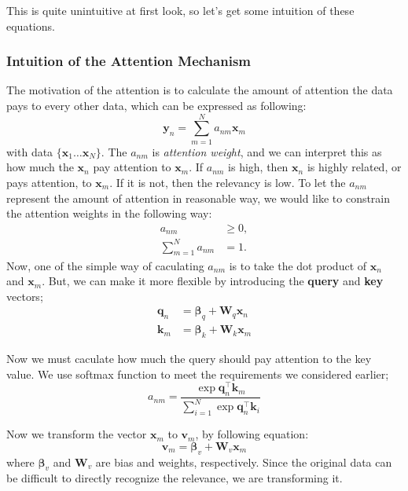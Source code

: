 \documentclass{article}
\begin{document}
            This is quite unintuitive at first look, so let's get some intuition of these equations.

        \subsubsection{Intuition of the Attention Mechanism}
            The motivation of the attention is to calculate the amount of attention the data pays to every other data,
            which can be expressed as following:
            \[
            \textbf{y}_n = \sum_{m=1}^{N}a_{nm}\textbf{x}_m
            \]
            with data $\{\textbf{x}_1 \dots \textbf{x}_N\}$.
            The $a_{nm}$ is \emph{attention weight}, and we can interpret this as how much the $\textbf{x}_n$ pay attention to $\textbf{x}_m$.
            If $a_{nm}$ is high, then $\textbf{x}_n$ is highly related, or pays attention, to $\textbf{x}_m$.
            If it is not, then the relevancy is low.
            To let the $a_{nm}$ represent the amount of attention in reasonable way, 
            we would like to constrain the attention weights
            in the following way:
            \begin{align*}
                a_{nm} & \geq 0, \\
                \sum_{m=1}^{N}a_{nm} & = 1.
            \end{align*}
            Now, one of the simple way of caculating $a_{nm}$ is to take the dot product of $\textbf{x}_n$ and $\textbf{x}_m$.
            But, we can make it more flexible by introducing the \textbf{query} and \textbf{key} vectors;
            \begin{align*}
                \textbf{q}_n &= \bm{\beta}_q + \textbf{W}_q\textbf{x}_n \\
                \textbf{k}_m &= \bm{\beta}_k + \textbf{W}_k\textbf{x}_m
            \end{align*}

            Now we must caculate how much the query should pay attention to the key value. We use softmax function to meet the requirements we
            considered earlier;
            \[
                a_{nm} = \frac{\exp \textbf{q}_n^\top \textbf{k}_m}
                {\sum_{i=1}^{N} \exp{\textbf{q}_n^\top \textbf{k}_i}}
            \]

            Now we transform the vector $\textbf{x}_m$ to $\textbf{v}_m$, by following equation:
            \[
                \textbf{v}_m = \bm{\beta}_v + \textbf{W}_v\textbf{x}_m
            \]
            where $\bm{\beta}_v$ and $\textbf{W}_v$ are bias and weights, respectively.
            Since the original data can be difficult to directly recognize the relevance, we are transforming it.
            
\end{document}
